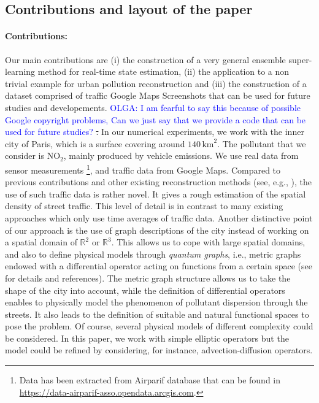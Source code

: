 \documentclass[11pt,a4paper,twoside]{article}
\theoremstyle{definition}
\numberwithin{equation}{section}
\newcommand{\bR}{\ensuremath{\mathbb{R}}}
\newcommand{\<}{\langle}
\renewcommand{\>}{\rangle}
\newcommand{\asmodif}[2]{{\color{teal} #1} {\sout{#2}}}
\newcommand{\om}[1]{\textcolor{blue}{#1}}
\begin{document}
\subsection{Contributions and layout of the paper}
\paragraph{Contributions:} Our main contributions are (i) the construction of a very general ensemble super-learning method for real-time state estimation, (ii) the application to a non trivial example for urban pollution reconstruction and \asmodif{(iii) the construction of a dataset comprised of traffic Google Maps Screenshots that can be used for future studies and developements. \om{OLGA: I am fearful to say this because of possible Google copyright problems, Can we just say that we provide a code that can be used for future studies?}}. In our numerical experiments, we work with the inner city of Paris, which is a surface covering around $140\,\textrm{km}^2$. The pollutant that we consider is $\textrm{NO}_2$, mainly produced by vehicle emissions. We use real data from sensor measurements \footnote{Data has been extracted from Airparif database that can be found in  \url{https://data-airparif-asso.opendata.arcgis.com}.}, and traffic data from Google Maps. Compared to previous contributions and other existing reconstruction methods (see, e.g., \cite{MSM2009, TMPPB2013}), the use of such traffic data is rather novel. It gives a rough estimation of the spatial density of street traffic. This level of detail is in contrast to many existing approaches which only use time averages of traffic data. Another distinctive point of our approach is the use of graph descriptions of the city instead of working on a spatial domain of $\bR^2$ or $\bR^3$. This allows us to cope with large spatial domains, and also to define physical models through \emph{quantum graphs}, i.e., metric graphs  endowed with a differential operator acting on functions from a certain space (see \cite{BK2013} for details and references). The metric graph structure allows us to take the shape of the city into account, while the definition of differential operators enables to physically model the phenomenon of pollutant dispersion through the streets. It also leads to the definition of suitable and natural functional spaces to pose the problem. Of course, several physical models of different complexity could be considered. In this paper, we work with simple elliptic operators but the model could be refined by considering, for instance, advection-diffusion operators. %
\end{document}
